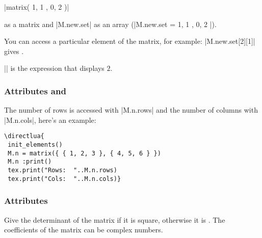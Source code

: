 |matrix({ { 1, 1 }, { 0, 2 } })|

 as a matrix and |M.new.set| as an array (|M.new.set = { { 1, 1 }, {0, 2 } }|).

You can access a particular element of the matrix, for example: |M.new.set[2][1]| gives .

|| is the expression that displays $2$.


\subsubsection{Attributes  and } %
\label{ssub:attributes_matrix_rows_and_cols}

The number of rows is accessed with |M.n.rows| and the number of columns with |M.n.cols|, here's an example:

\vspace{.5em}
\begin{minipage}{.5\textwidth}
\begin{verbatim}
\directlua{
 init_elements()
 M.n = matrix({ { 1, 2, 3 }, { 4, 5, 6 } })
 M.n :print()
 tex.print("Rows:  "..M.n.rows)
 tex.print("Cols:  "..M.n.cols)}
\end{verbatim}
\end{minipage}
\begin{minipage}{.5\textwidth}
\end{minipage}

\subsubsection{Attributes  } %
\label{ssub:attributes_matrix_det}
Give the determinant of the matrix if it is square, otherwise it is . The coefficients of the matrix can be complex numbers.

